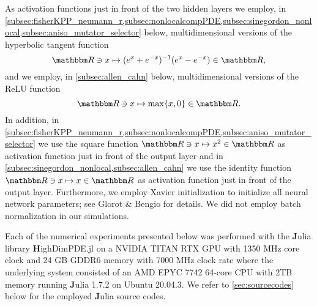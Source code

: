 As activation functions just in front of the two hidden layers we employ, in \cref{subsec:fisherKPP_neumann_r,subsec:nonlocalcompPDE,subsec:sinegordon_nonlocal,subsec:aniso_mutator_selector} below, multidimensional versions of the hyperbolic tangent function
\begin{equation}
	\R \ni x \mapsto (e^x + e^{-x})^{-1} (e^{x} - e^{-x}) \in \R,
\end{equation}
and we employ, in \cref{subsec:allen_cahn} below, multidimensional versions of the ReLU function
\begin{equation}
	\R\ni x\mapsto \max\{x,0\}\in\R.
\end{equation}
In addition, in \cref{subsec:fisherKPP_neumann_r,subsec:nonlocalcompPDE,subsec:aniso_mutator_selector} we use the square function 
$
\R \ni x \mapsto x^2 \in \R
$
as activation function just in front of the output layer and in \cref{subsec:sinegordon_nonlocal,subsec:allen_cahn} we use the identity function 
$
\R \ni x \mapsto x \in \R
$
as activation function just in front of the output layer.
Furthermore, we employ Xavier initialization to initialize all neural network parameters; see Glorot \& Bengio \citep{glorot2010} for details. We did not employ batch normalization in our simulations.
%
%

Each of the numerical experiments presented below was performed with the {\textbf Julia} library {\textbf HighDimPDE.jl} on a NVIDIA TITAN RTX GPU with 1350 MHz core clock and 24 GB GDDR6 memory with 7000 MHz clock rate where the underlying system consisted of an AMD EPYC 7742 64-core CPU with 2TB memory running {\textbf Julia} 1.7.2 on Ubuntu 20.04.3.
We refer to \cref{sec:sourcecodes} below for the employed {\textbf Julia} source codes.


